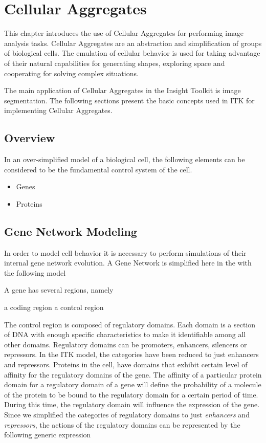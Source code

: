 
\chapter{Cellular Aggregates}

This chapter introduces the use of Cellular Aggregates for performing image
analysis tasks. Cellular Aggregates are an abstraction and simplification of
groups of biological cells. The emulation of cellular behavior is used for
taking advantage of their natural capabilities for generating shapes, exploring
space and cooperating for solving complex situations. 

The main application of Cellular Aggregates in the Insight Toolkit is image
segmentation. The following sections present the basic concepts used in ITK for
implementing Cellular Aggregates.

\section{Overview}

In an over-simplified model of a biological cell, the following elements can be
considered to be the fundamental control system of the cell.

\begin{itemize}
\item Genes
\item Proteins
\end{itemize}

\section{Gene Network Modeling}

In order to model cell behavior it is necessary to perform simulations of their 
internal gene network evolution. A Gene Network is simplified here in the with the
following model

A gene has several regions, namely

a coding region
a control region

The control region is composed of regulatory domains. Each domain is a section
of DNA with enough specific characteristics to make it identifiable among all
other domains.  Regulatory domains can be promoters, enhancers, silencers or
repressors.  In the ITK model, the categories have been reduced to just
enhancers and repressors.  Proteins in the cell, have domains that exhibit
certain level of affinity for the regulatory domains of the gene. The affinity
of a particular protein domain for a regulatory domain of a gene will define
the probability of a molecule of the protein to be bound to the regulatory
domain for a certain period of time.  During this time, the regulatory domain
will influence the expression of the gene. Since we simplified the categories
of regulatory domains to just \emph{enhancers} and \emph{repressors}, the
actions of the regulatory domains can be represented by the following generic
expression

